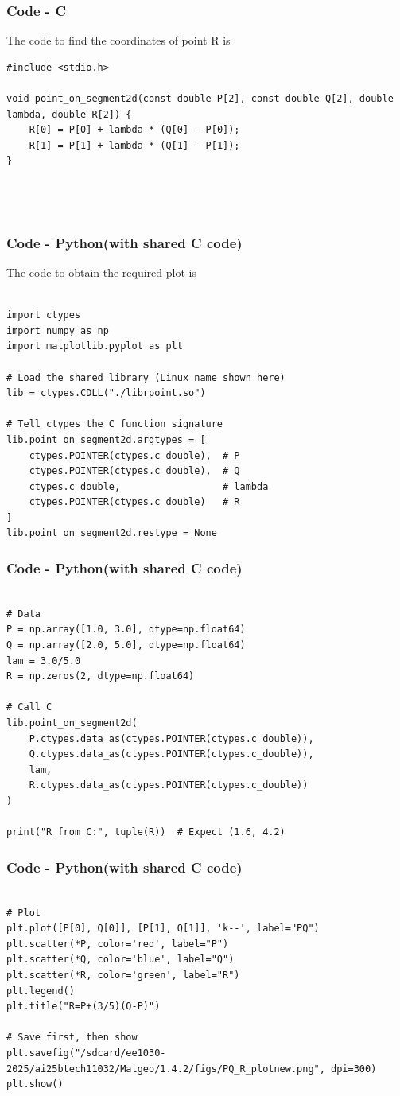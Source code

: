 \documentclass{beamer}
\theoremstyle{remark}
\numberwithin{equation}{section}
\begin{document}
\begin{frame}[fragile]
    \frametitle{Code - C}
    The code to find the coordinates of point R is
    \begin{lstlisting}
#include <stdio.h>

void point_on_segment2d(const double P[2], const double Q[2], double lambda, double R[2]) {
    R[0] = P[0] + lambda * (Q[0] - P[0]);
    R[1] = P[1] + lambda * (Q[1] - P[1]);
}




\end{lstlisting}
\end{frame}

\begin{frame}[fragile]
    \frametitle{Code - Python(with shared C code)}
    The code to obtain the required plot is
    \begin{lstlisting}

import ctypes
import numpy as np
import matplotlib.pyplot as plt

# Load the shared library (Linux name shown here)
lib = ctypes.CDLL("./librpoint.so")

# Tell ctypes the C function signature
lib.point_on_segment2d.argtypes = [
    ctypes.POINTER(ctypes.c_double),  # P
    ctypes.POINTER(ctypes.c_double),  # Q
    ctypes.c_double,                  # lambda
    ctypes.POINTER(ctypes.c_double)   # R
]
lib.point_on_segment2d.restype = None

\end{lstlisting}
\end{frame}
\begin{frame}[fragile]
\frametitle{Code - Python(with shared C code)}
\begin{lstlisting}

# Data
P = np.array([1.0, 3.0], dtype=np.float64)
Q = np.array([2.0, 5.0], dtype=np.float64)
lam = 3.0/5.0
R = np.zeros(2, dtype=np.float64)

# Call C
lib.point_on_segment2d(
    P.ctypes.data_as(ctypes.POINTER(ctypes.c_double)),
    Q.ctypes.data_as(ctypes.POINTER(ctypes.c_double)),
    lam,
    R.ctypes.data_as(ctypes.POINTER(ctypes.c_double))
)

print("R from C:", tuple(R))  # Expect (1.6, 4.2)

\end{lstlisting}
\end{frame}
\begin{frame}[fragile]
\frametitle{Code - Python(with shared C code)}
\begin{lstlisting}

# Plot
plt.plot([P[0], Q[0]], [P[1], Q[1]], 'k--', label="PQ")
plt.scatter(*P, color='red', label="P")
plt.scatter(*Q, color='blue', label="Q")
plt.scatter(*R, color='green', label="R")
plt.legend()
plt.title("R=P+(3/5)(Q-P)")

# Save first, then show
plt.savefig("/sdcard/ee1030-2025/ai25btech11032/Matgeo/1.4.2/figs/PQ_R_plotnew.png", dpi=300)
plt.show()


\end{lstlisting}
\end{frame}
\end{document}
